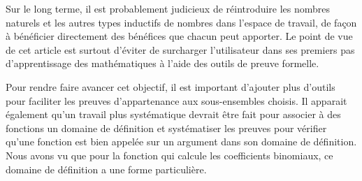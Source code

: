 \documentclass[draft]{jflart}
\begin{document}
Sur le long terme, il est probablement judicieux de réintroduire les
nombres naturels et les autres types inductifs de nombres dans
l'espace de travail, de façon à bénéficier directement des bénéfices
que chacun peut apporter.  Le point de vue de cet article est surtout
d'éviter de surcharger l'utilisateur dans ses premiers pas
d'apprentissage des mathématiques à l'aide des outils de preuve
formelle.

Pour rendre faire avancer cet objectif, il est important d'ajouter
plus d'outils pour faciliter les preuves d'appartenance aux
sous-ensembles choisis.  Il apparait également qu'un travail plus
systématique devrait être fait pour associer à des fonctions un
domaine de définition et systématiser les preuves pour vérifier qu'une
fonction est bien appelée sur un argument dans son domaine de
définition.  Nous avons vu que pour la fonction qui calcule les
coefficients binomiaux, ce domaine de définition a une forme particulière.






\end{document}
